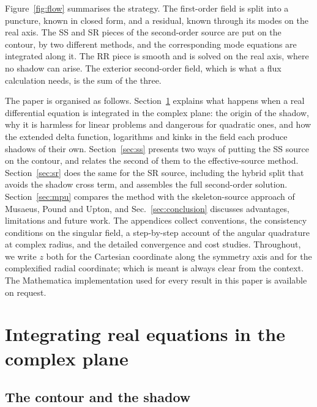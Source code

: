 \documentclass[aps,prd,twocolumn,superscriptaddress,nofootinbib,floatfix]{revtex4-2}
\begin{document}
Figure~\ref{fig:flow} summarises the strategy.
The first-order field is split into a puncture, known in closed form, and a residual, known through its modes on the real axis.
The SS and SR pieces of the second-order source are put on the contour, by two different methods, and the corresponding mode equations are integrated along it.
The RR piece is smooth and is solved on the real axis, where no shadow can arise.
The exterior second-order field, which is what a flux calculation needs, is the sum of the three.

The paper is organised as follows.
Section~\ref{sec:complex} explains what happens when a real differential equation is integrated in the complex plane: the origin of the shadow, why it is harmless for linear problems and dangerous for quadratic ones, and how the extended delta function, logarithms and kinks in the field each produce shadows of their own.
Section~\ref{sec:ss} presents two ways of putting the SS source on the contour, and relates the second of them to the effective-source method.
Section~\ref{sec:sr} does the same for the SR source, including the hybrid split that avoids the shadow cross term, and assembles the full second-order solution.
Section~\ref{sec:mpu} compares the method with the skeleton-source approach of Musaeus, Pound and Upton, and Sec.~\ref{sec:conclusion} discusses advantages, limitations and future work.
The appendices collect conventions, the consistency conditions on the singular field, a step-by-step account of the angular quadrature at complex radius, and the detailed convergence and cost studies.
Throughout, we write $z$ both for the Cartesian coordinate along the symmetry axis and for the complexified radial coordinate; which is meant is always clear from the context.
The Mathematica implementation used for every result in this paper is available on request.

\section{Integrating real equations in the complex plane}\label{sec:complex}

\subsection{The contour and the shadow}\label{sec:shadow}
\end{document}
